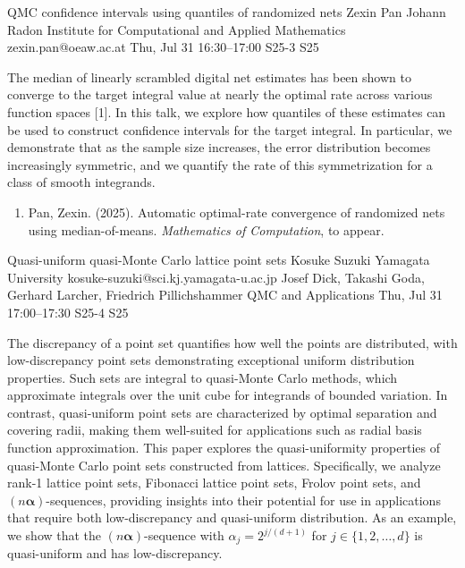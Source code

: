 \begin{talk}
  {QMC confidence intervals using quantiles of randomized nets}%
  {Zexin Pan}%
  {Johann Radon Institute for Computational and Applied Mathematics}%
  {zexin.pan@oeaw.ac.at}%
  {}%
  {}%
  {Thu, Jul 31 16:30--17:00}%
  {S25-3}%
  {S25}%
  {}%
  
    


The median of linearly scrambled digital net estimates has been shown to converge to the target integral value at nearly the optimal rate across various function spaces [1]. In this talk, we explore how quantiles of these estimates can be used to construct confidence intervals for the target integral. In particular, we demonstrate that as the sample size increases, the error distribution becomes increasingly symmetric, and we quantify the rate of this symmetrization for a class of smooth integrands.
            
\medskip


\begin{enumerate}
 \item[{[1]}] Pan, Zexin. (2025). Automatic optimal-rate convergence of randomized nets using median-of-means. {\it  Mathematics of Computation}, to appear.
\end{enumerate}

\end{talk}

\begin{talk}
  {Quasi-uniform quasi-Monte Carlo lattice point sets}%
  {Kosuke Suzuki}%
  {Yamagata University}%
  {kosuke-suzuki@sci.kj.yamagata-u.ac.jp}%
  {Josef Dick, Takashi Goda, Gerhard Larcher, Friedrich Pillichshammer}%
  {QMC and Applications}%
  {Thu, Jul 31 17:00--17:30}%
  {S25-4}%
  {S25}%
    
   

The discrepancy of a point set quantifies how well the points are distributed, with low-discrepancy point sets demonstrating exceptional uniform distribution properties. Such sets are integral to quasi-Monte Carlo methods, which approximate integrals over the unit cube for integrands of bounded variation. In contrast, quasi-uniform point sets are characterized by optimal separation and covering radii, making them well-suited for applications such as radial basis function approximation. This paper explores the quasi-uniformity properties of quasi-Monte Carlo point sets constructed from lattices. Specifically, we analyze rank-1 lattice point sets, Fibonacci lattice point sets, Frolov point sets, and $(n \boldsymbol{\alpha})$-sequences, providing insights into their potential for use in applications that require both low-discrepancy and quasi-uniform distribution. As an example, we show that the $(n \boldsymbol{\alpha})$-sequence with $\alpha_j = 2^{j/(d+1)}$ for $j \in \{1, 2, \ldots, d\}$ is quasi-uniform and has low-discrepancy.


\end{talk}

